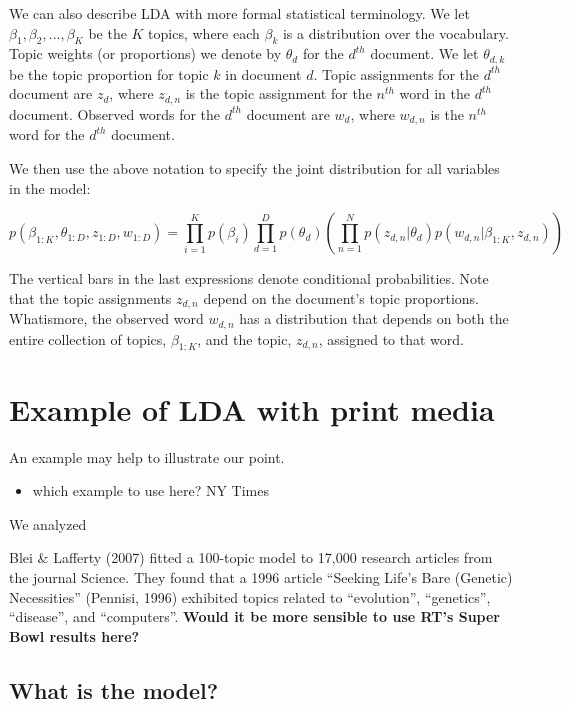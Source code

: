 \documentclass[12pt,]{article}
\providecommand{\tightlist}{%
  \setlength{\itemsep}{0pt}\setlength{\parskip}{0pt}}
\begin{document}
We can also describe LDA with more formal statistical terminology. We
let \(\beta_1, \beta_2, ..., \beta_K\) be the \(K\) topics, where each
\(\beta_k\) is a distribution over the vocabulary. Topic weights (or
proportions) we denote by \(\theta_d\) for the \(d^{th}\) document. We
let \(\theta_{d,k}\) be the topic proportion for topic \(k\) in document
\(d\). Topic assignments for the \(d^{th}\) document are \(z_d\), where
\(z_{d,n}\) is the topic assignment for the \(n^{th}\) word in the
\(d^{th}\) document. Observed words for the \(d^{th}\) document are
\(w_d\), where \(w_{d, n}\) is the \(n^{th}\) word for the \(d^{th}\)
document.

We then use the above notation to specify the joint distribution for all
variables in the model:

\[p(\beta_{1:K}, \theta_{1:D}, z_{1:D}, w_{1:D}) = \prod_{i = 1}^Kp(\beta_i)\prod_{d = 1}^Dp(\theta_d)\left( \prod_{n = 1}^N p(z_{d,n}|\theta_d)p(w_{d,n}|\beta_{1:K}, z_{d,n})\right)\]

The vertical bars in the last expressions denote conditional
probabilities. Note that the topic assignments \(z_{d,n}\) depend on the
document's topic proportions. Whatismore, the observed word \(w_{d,n}\)
has a distribution that depends on both the entire collection of topics,
\(\beta_{1:K}\), and the topic, \(z_{d,n}\), assigned to that word.

\section{Example of LDA with print
media}\label{example-of-lda-with-print-media}

An example may help to illustrate our point.

\begin{itemize}
\tightlist
\item
  which example to use here? NY Times
\end{itemize}

We analyzed

Blei \& Lafferty (2007) fitted a 100-topic model to 17,000 research
articles from the journal Science. They found that a 1996 article
``Seeking Life's Bare (Genetic) Necessities'' (Pennisi, 1996) exhibited
topics related to ``evolution'', ``genetics'', ``disease'', and
``computers''. \textbf{Would it be more sensible to use RT's Super Bowl
results here?}

\subsection{What is the model?}\label{what-is-the-model}
\end{document}
